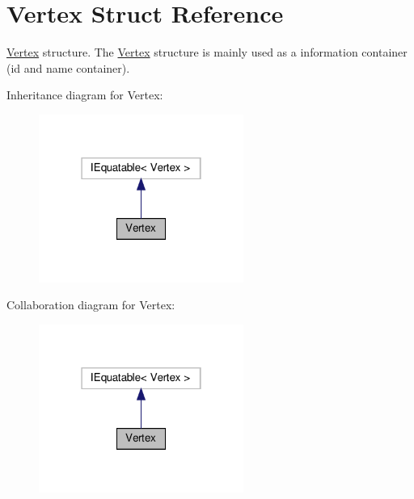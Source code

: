 \hypertarget{structVertex}{}\section{Vertex Struct Reference}
\label{structVertex}


\hyperlink{structVertex}{Vertex} structure. The \hyperlink{structVertex}{Vertex} structure is mainly used as a information container (id and name container).  




Inheritance diagram for Vertex\+:\nopagebreak
\begin{figure}[H]
\begin{center}
\leavevmode
\includegraphics[width=190pt]{structVertex__inherit__graph}
\end{center}
\end{figure}


Collaboration diagram for Vertex\+:\nopagebreak
\begin{figure}[H]
\begin{center}
\leavevmode
\includegraphics[width=190pt]{structVertex__coll__graph}
\end{center}
\end{figure}
